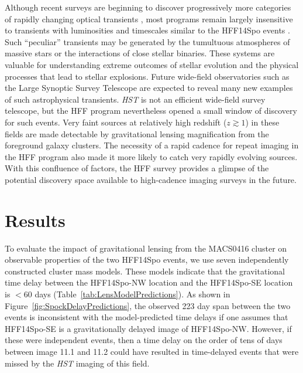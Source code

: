 \documentclass{article}
\def\HST{{\it HST}\xspace}
\def\spock{HFF14Spo\xspace}
\def\spockone{HFF14Spo-NW\xspace}
\def\spocktwo{HFF14Spo-SE\xspace}
\def\MACS0416{MACS0416\xspace}
\begin{document}
Although recent surveys are beginning to discover progressively more
categories of rapidly changing optical transients
\cite{Kasliwal:2011a,Drout:2014}, most programs remain largely
insensitive to transients with luminosities and timescales similar to
the \spock events \cite{Berger:2013b}.  Such ``peculiar'' transients
may be generated by the tumultuous atmospheres of massive stars or the
interactions of close stellar binaries.  These systems are valuable
for understanding extreme outcomes of stellar evolution and the
physical processes that lead to stellar explosions. Future wide-field
observatories such as the Large Synoptic Survey
Telescope\cite{Tyson:2002} are expected to reveal many new examples of
such astrophysical transients.  \HST is not an efficient wide-field
survey telescope, but the HFF program nevertheless opened a small
window of discovery for such events.  Very faint sources at relatively
high redshift ($z\gtrsim1$) in these fields are made detectable by
gravitational lensing magnification from the foreground galaxy
clusters.  The necessity of a rapid cadence for repeat imaging in the
HFF program also made it more likely to catch very rapidly evolving
sources.  With this confluence of factors, the HFF survey provides a
glimpse of the potential discovery space available to high-cadence
imaging surveys in the future.



\section{Results}\label{sec:Results}

To evaluate the impact of gravitational lensing from the \MACS0416
cluster on observable properties of the two \spock events, we use seven
independently constructed cluster mass models.  These models indicate
that the gravitational time delay between the \spockone location and
the \spocktwo location is $<$60 days
(Table~\ref{tab:LensModelPredictions}).  As shown in
Figure~\ref{fig:SpockDelayPredictions}, the observed 223 day span
between the two events is inconsistent with the model-predicted time
delays if one assumes that \spocktwo is a gravitationally delayed
image of \spockone.  However, if these were independent events, then a
time delay on the order of tens of days between image 11.1 and 11.2
could have resulted in time-delayed events that were missed by the
\HST imaging of this field.
\end{document}
